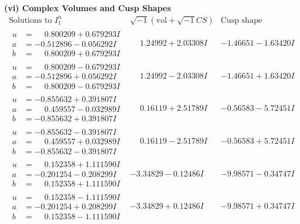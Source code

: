 \documentclass[1p]{elsarticle_modified}
\theoremstyle{definition}
\newcommand{\I}{\sqrt{-1}}
\begin{document}
\newpage\flushleft \textbf{(vi) Complex Volumes and Cusp Shapes}
$$\begin{array}{c|c|c}  
\text{Solutions to }I^u_{1}& \I (\text{vol} + \sqrt{-1}CS) & \text{Cusp shape}\\
 \hline 
\begin{aligned}
u &= \phantom{-}0.800209 + 0.679293 I \\
a &= -0.512896 - 0.056292 I \\
b &= \phantom{-}0.800209 + 0.679293 I\end{aligned}
 & \phantom{-}1.24992 + 2.03308 I & -1.46651 - 1.63420 I \\ \hline\begin{aligned}
u &= \phantom{-}0.800209 - 0.679293 I \\
a &= -0.512896 + 0.056292 I \\
b &= \phantom{-}0.800209 - 0.679293 I\end{aligned}
 & \phantom{-}1.24992 - 2.03308 I & -1.46651 + 1.63420 I \\ \hline\begin{aligned}
u &= -0.855632 + 0.391807 I \\
a &= \phantom{-}0.459557 - 0.032989 I \\
b &= -0.855632 + 0.391807 I\end{aligned}
 & \phantom{-}0.16119 + 2.51789 I & -0.56583 - 5.72451 I \\ \hline\begin{aligned}
u &= -0.855632 - 0.391807 I \\
a &= \phantom{-}0.459557 + 0.032989 I \\
b &= -0.855632 - 0.391807 I\end{aligned}
 & \phantom{-}0.16119 - 2.51789 I & -0.56583 + 5.72451 I \\ \hline\begin{aligned}
u &= \phantom{-}0.152358 + 1.111590 I \\
a &= -0.201254 - 0.208299 I \\
b &= \phantom{-}0.152358 + 1.111590 I\end{aligned}
 & -3.34829 - 0.12486 I & -9.98571 - 0.34747 I \\ \hline\begin{aligned}
u &= \phantom{-}0.152358 - 1.111590 I \\
a &= -0.201254 + 0.208299 I \\
b &= \phantom{-}0.152358 - 1.111590 I\end{aligned}
 & -3.34829 + 0.12486 I & -9.98571 + 0.34747 I \\ \hline\begin{aligned}

\end{aligned}
\end{array}$$
\end{document}
